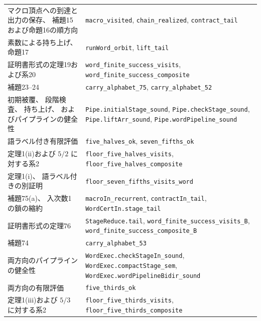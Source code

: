 \documentclass[11pt,reqno]{amsart}
\theoremstyle{definition}
\theoremstyle{definition}
\theoremstyle{remark}
\begin{document}
\begin{longtable}{@{}>{\raggedright\arraybackslash}p{} >{\raggedright\arraybackslash}p{}@{}}
マクロ頂点への到達と出力の保存、\allowbreak{} 補題15および命題16の順方向 & \nolinkurl{macro_visited},\allowbreak{} \nolinkurl{chain_realized},\allowbreak{} \nolinkurl{contract_tail} \\
素数による持ち上げ、\allowbreak{} 命題17 & \nolinkurl{runWord_orbit},\allowbreak{} \nolinkurl{lift_tail} \\
証明書形式の定理19および系20 & \nolinkurl{word_finite_success_visits},\allowbreak{} \nolinkurl{word_finite_success_composite} \\
補題23--24 & \nolinkurl{carry_alphabet_75},\allowbreak{} \nolinkurl{carry_alphabet_52} \\
初期被覆、\allowbreak{} 段階検査、\allowbreak{} 持ち上げ、\allowbreak{} およびパイプラインの健全性 & \nolinkurl{Pipe.initialStage_sound},\allowbreak{} \nolinkurl{Pipe.checkStage_sound},\allowbreak{} \nolinkurl{Pipe.liftArr_sound},\allowbreak{} \nolinkurl{Pipe.wordPipeline_sound} \\
語ラベル付き有限評価 & \nolinkurl{five_halves_ok},\allowbreak{} \nolinkurl{seven_fifths_ok} \\
定理1(ii)および \(5/2\) に対する系2 & \nolinkurl{floor_five_halves_visits},\allowbreak{} \nolinkurl{floor_five_halves_composite} \\
定理1(i)、\allowbreak{} 語ラベル付きの別証明 & \nolinkurl{floor_seven_fifths_visits_word} \\
補題75(a)、\allowbreak{} 入次数1の鎖の縮約 & \nolinkurl{macroIn_recurrent},\allowbreak{} \nolinkurl{contractIn_tail},\allowbreak{} \nolinkurl{WordCertIn.stage_tail} \\
証明書形式の定理76 & \nolinkurl{StageReduce.tail},\allowbreak{} \nolinkurl{word_finite_success_visits_B},\allowbreak{} \nolinkurl{word_finite_success_composite_B} \\
補題74 & \nolinkurl{carry_alphabet_53} \\
両方向のパイプラインの健全性 & \nolinkurl{WordExec.checkStageIn_sound},\allowbreak{} \nolinkurl{WordExec.compactStage_sem},\allowbreak{} \nolinkurl{WordExec.wordPipelineBidir_sound} \\
両方向の有限評価 & \nolinkurl{five_thirds_ok} \\
定理1(iii)および \(5/3\) に対する系2 & \nolinkurl{floor_five_thirds_visits},\allowbreak{} \nolinkurl{floor_five_thirds_composite} \\
\end{longtable}
\endgroup
\end{document}
